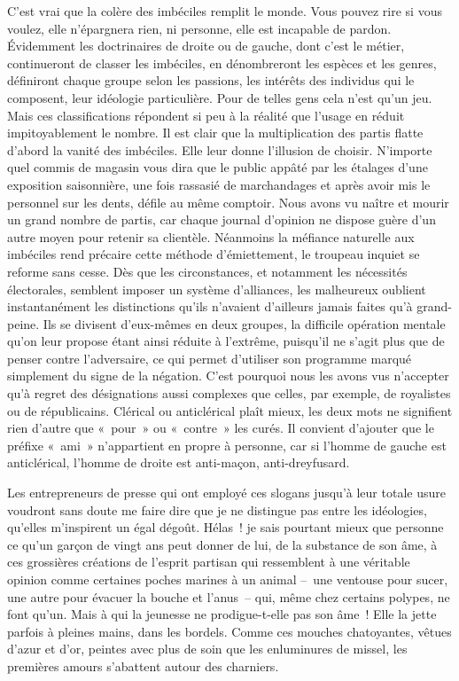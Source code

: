 \documentclass[french,twoside]{book} %
\begin{document}
C’est vrai que la colère des imbéciles remplit le monde. Vous pouvez rire si vous voulez, elle n’épargnera rien, ni personne, elle est incapable de pardon. Évidemment les doctrinaires de droite ou de gauche, dont c’est le métier, continueront de classer les imbéciles, en dénombreront les espèces et les genres, définiront chaque groupe selon les passions, les intérêts des individus qui le composent, leur idéologie particulière. Pour de telles gens cela n’est qu’un jeu. Mais ces classifications répondent si peu à la réalité que l’usage en réduit impitoyablement le nombre. Il est clair que la multiplication des partis flatte d’abord la vanité des imbéciles. Elle leur donne l’illusion de choisir. N’importe quel commis de magasin vous dira que le public appâté par les étalages d’une exposition saisonnière, une fois rassasié de marchandages et après avoir mis le personnel sur les dents, défile au même comptoir. Nous avons vu naître et mourir un grand nombre de partis, car chaque journal d’opinion ne dispose guère d’un autre moyen pour retenir sa clientèle. Néanmoins la méfiance naturelle aux imbéciles rend précaire cette méthode d’émiettement, le troupeau inquiet se reforme sans cesse. Dès que les circonstances, et notamment les nécessités électorales, semblent imposer un système d’alliances, les malheureux oublient instantanément les distinctions qu’ils n’avaient d’ailleurs jamais faites qu’à grand-peine. Ils se divisent d’eux-mêmes en deux groupes, la difficile opération mentale qu’on leur propose étant ainsi réduite à l’extrême, puisqu’il ne s’agit plus que de penser contre l’adversaire, ce qui permet d’utiliser son programme marqué simplement du signe de la négation. C’est pourquoi nous les avons vus n’accepter qu’à regret des désignations aussi complexes que celles, par exemple, de royalistes ou de républicains. Clérical ou anticlérical plaît mieux, les deux mots ne signifient rien d’autre que « pour » ou « contre » les curés. Il convient d’ajouter que le préfixe « ami » n’appartient en propre à personne, car si l’homme de gauche est anticlérical, l’homme de droite est anti-maçon, anti-dreyfusard.\par
Les entrepreneurs de presse qui ont employé ces slogans jusqu’à leur totale usure voudront sans doute me faire dire que je ne distingue pas entre les idéologies, qu’elles m’inspirent un égal dégoût. Hélas ! je sais pourtant mieux que personne ce qu’un garçon de vingt ans peut donner de lui, de la substance de son âme, à ces grossières créations de l’esprit partisan qui ressemblent à une véritable opinion comme certaines poches marines à un animal – une ventouse pour sucer, une autre pour évacuer la bouche et l’anus – qui, même chez certains polypes, ne font qu’un. Mais à qui la jeunesse ne prodigue-t-elle pas son âme ! Elle la jette parfois à pleines mains, dans les bordels. Comme ces mouches chatoyantes, vêtues d’azur et d’or, peintes avec plus de soin que les enluminures de missel, les premières amours s’abattent autour des charniers.\par
\end{document}
